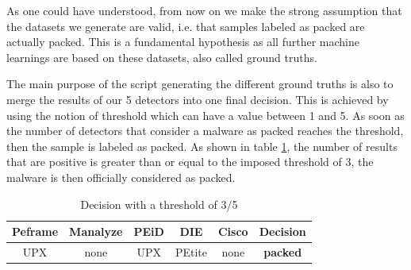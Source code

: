 As one could have understood, from now on we make the strong assumption that the datasets we generate are valid, i.e. that samples labeled as packed are actually packed. This is a fundamental hypothesis as all further machine learnings are based on these datasets, also called ground truths.

The main purpose of the script generating the different ground truths is also to merge the results of our 5 detectors into one final decision. This is achieved by using the notion of threshold which can have a value between 1 and 5. As soon as the number of detectors that consider a malware as packed reaches the threshold, then the sample is labeled as packed. As shown in table \ref{fig:agreements}, the number of results that are positive is greater than or equal to the imposed threshold of 3, the malware is then officially considered as packed. 

\begin{table}[h]
    \centering
    \begin{tabular}{|c|c|c|c|c|c|}
    \hline
     Peframe & Manalyze & PEiD & DIE & Cisco & Decision \\
    \hline
     UPX & none & UPX & PEtite & none & \textbf{packed} \\
    \hline
    \end{tabular}
    \caption{Decision with a threshold of 3/5}
    \label{fig:agreements}
\end{table}




